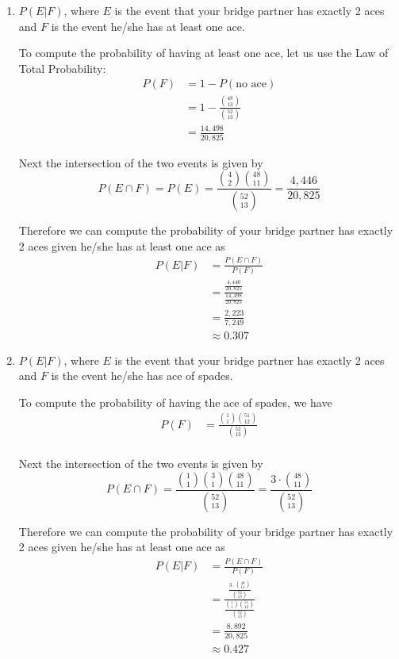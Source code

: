 \documentclass[11pt, oneside]{article}   	%
\begin{document}
\begin{enumerate}[\quad (a)]
	\item $P(E | F)$, where $E$ is the event that your bridge partner has exactly 2 aces and $F$ is the event he/she has at least one ace.
	
	To compute the probability of having at least one ace, let us use the Law of Total Probability:
	\begin{align*}
		P(F) & = 1 - P(\text{no ace}) \\
		& = 1 - \frac{{48 \choose 13}}{{52 \choose 13}} \\
		& =  \frac{14,498}{20,825} 
	\end{align*}
	
	Next the intersection of the two events is given by
	$$P(E \cap F)  = P(E) = \frac{{4 \choose 2}{48 \choose 11}}{{52 \choose 13}} =  \frac{4,446}{20,825} $$

	Therefore we can compute the probability of your bridge partner has exactly 2 aces given he/she has at least one ace as
	\begin{align*}
	P(E | F) & = \frac{P(E \cap F)}{P(F)} \\
	& = \frac{\frac{4,446}{20,825}}{\frac{14,498}{20,825}} \\
	& = \frac{2,223}{7,249} \\
	& \approx 0.307
	\end{align*}
	
	\item $P(E | F)$, where $E$ is the event that your bridge partner has exactly 2 aces and $F$ is the event he/she has ace of spades.
	
	To compute the probability of having the ace of spades, we have
	\begin{align*}
		P(F) & = \frac{{1 \choose 1}{51 \choose 12}}{{52 \choose 13}} \\
	\end{align*}
	
	Next the intersection of the two events is given by
	$$P(E \cap F) = \frac{{1 \choose 1}{3 \choose 1}{48 \choose 11}}{{52 \choose 13}}=  \frac{3 \cdot {48 \choose 11}}{{52 \choose 13}}$$

	Therefore we can compute the probability of your bridge partner has exactly 2 aces given he/she has at least one ace as
	\begin{align*}
	P(E | F) & = \frac{P(E \cap F)}{P(F)} \\
	& = \frac{\frac{3 \cdot {48 \choose 11}}{{52 \choose 13}}}{\frac{{1 \choose 1}{51 \choose 12}}{{52 \choose 13}}} \\
	& = \frac{8,892}{20,825} \\
	& \approx 0.427
	\end{align*}
\end{enumerate}
\end{document}
